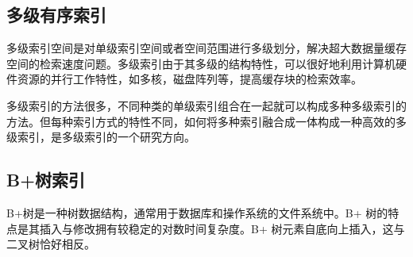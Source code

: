 \subsection{多级有序索引}

多级索引空间是对单级索引空间或者空间范围进行多级划分，解决超大数据量缓存空间的检索速度问题。多级索引由于其多级的结构特性，可以很好地利用计算机硬件资源的并行工作特性，如多核，磁盘阵列等，提高缓存块的检索效率。

多级索引的方法很多，不同种类的单级索引组合在一起就可以构成多种多级索引的方法。但每种索引方式的特性不同，如何将多种索引融合成一体构成一种高效的多级索引，是多级索引的一个研究方向。

\subsection{B+树索引}
B+树是一种树数据结构，通常用于数据库和操作系统的文件系统中。B+ 树的特点是其插入与修改拥有较稳定的对数时间复杂度。B+ 树元素自底向上插入，这与二叉树恰好相反。

